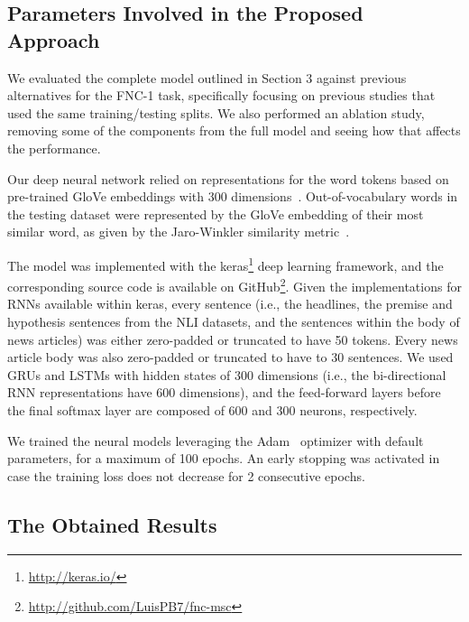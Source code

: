 \subsection{Parameters Involved in the Proposed Approach}

We evaluated the complete model outlined in Section 3 against previous alternatives for the FNC-1 task, specifically focusing on previous studies that used the same training/testing splits. We also performed an ablation study, removing some of the components from the full model and seeing how that affects the performance.

Our deep neural network relied on representations for the word tokens based on pre-trained GloVe embeddings with 300 dimensions~\cite{glove}. Out-of-vocabulary words in the testing dataset were represented by the GloVe embedding of their most similar word, as given by the Jaro-Winkler similarity metric~\citep{winkler1990string}.

The model was implemented with the keras\footnote{\scriptsize{\url{http://keras.io/}}} deep learning framework, and the corresponding source code is available on GitHub\footnote{\scriptsize{\url{http://github.com/LuisPB7/fnc-msc}}}. Given the implementations for RNNs available within keras, every sentence (i.e., the headlines, the premise and hypothesis sentences from the NLI datasets, and the sentences within the body of news articles) was either zero-padded or truncated to have 50 tokens. Every news article body was also zero-padded or truncated to have to 30 sentences. We used GRUs and LSTMs with hidden states of 300 dimensions (i.e., the bi-directional RNN representations have 600 dimensions), and the feed-forward layers before the final softmax layer are composed of 600 and 300 neurons, respectively. 

We trained the neural models leveraging the Adam~\cite{kingma2014adam} optimizer with default parameters, for a maximum of 100 epochs. An early stopping was activated in case the training loss does not decrease for 2 consecutive epochs. 

\subsection{The Obtained Results}


